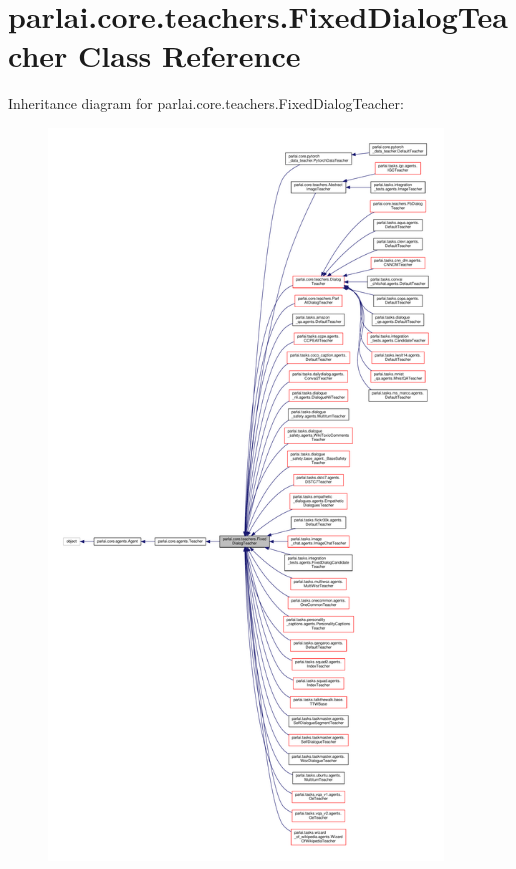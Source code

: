 \hypertarget{classparlai_1_1core_1_1teachers_1_1FixedDialogTeacher}{}\section{parlai.\+core.\+teachers.\+Fixed\+Dialog\+Teacher Class Reference}
\label{classparlai_1_1core_1_1teachers_1_1FixedDialogTeacher}


Inheritance diagram for parlai.\+core.\+teachers.\+Fixed\+Dialog\+Teacher\+:
\nopagebreak
\begin{figure}[H]
\begin{center}
\leavevmode
\includegraphics[height=550pt]{dc/dda/classparlai_1_1core_1_1teachers_1_1FixedDialogTeacher__inherit__graph}
\end{center}
\end{figure}


